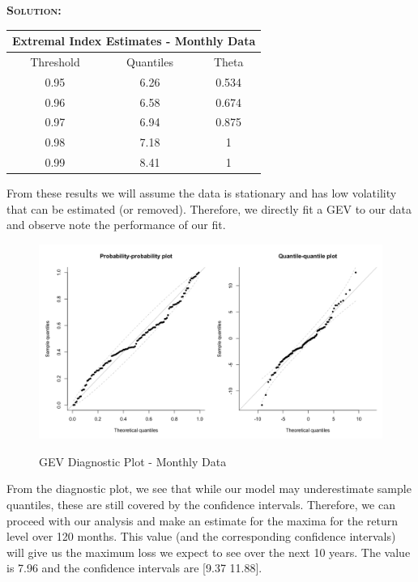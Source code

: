 \documentclass[12pt,oneside]{article}
\newenvironment{solution}
    {\textbf{\textsc{Solution:}}\\}
    {\newpage}
\begin{document}
\begin{solution}
\begin{center}
\begin{tabular}{ ||c |c |c|| }\hline
\multicolumn{3}{||c||}{Extremal Index Estimates - Monthly Data}\\\hline\hline
Threshold & Quantiles& Theta\\\hline
 0.95 & 6.26 & 0.534 \\ \hline
 0.96 & 6.58 & 0.674 \\  \hline
 0.97 & 6.94 & 0.875  \\\hline  
 0.98 & 7.18 & 1 \\ \hline
 0.99 & 8.41 & 1 \\  \hline
\end{tabular}
\end{center}

 From these results we will assume the data is stationary and has low volatility that can be estimated (or removed). Therefore, we directly fit a GEV to our data and observe note the performance of our fit.
 \begin{figure}[H]
\begin{center}
{\includegraphics[width=4.5in]{Assignments/a4/month-diag.png}}
\caption{GEV Diagnostic Plot - Monthly Data}
\end{center}
\end{figure}
From the diagnostic plot, we see that while our model may underestimate sample quantiles, these are still covered by the confidence intervals. Therefore, we can proceed with our analysis and make an estimate for the maxima for the return level over 120 months. This value (and the corresponding confidence intervals) will give us the maximum loss we expect to see over the next 10 years. The value is 7.96 and the confidence intervals are   [9.37 11.88].



\end{solution}
\end{document}
